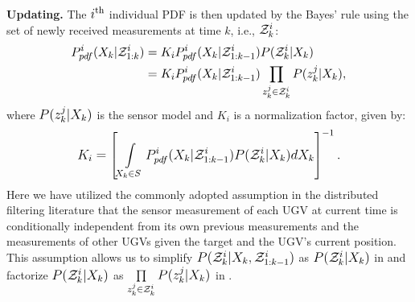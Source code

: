 	\textbf{Updating.}
	The $i\thi$ individual PDF is then updated by the Bayes' rule using the set of newly received measurements at time $k$, i.e., $\Z^i_k$:
	\begin{subequations}\label{eqn:bayes_upd}
		\small\begin{align}
				P^i_{pdf}(\X_k|\Z^i_{1:k})
				&= K_iP^i_{pdf}(\X_k|\Z^i_{1:k-1})P(\Z^i_k|\X_k)\label{subeqn:bayes_upd_general}\\
				&=K_iP^i_{pdf}(\X_k|\Z^i_{1:k-1})\prod\limits_{z^j_k\in\Z^i_k}P(z^j_k|\X_{k})\label{subeqn:bayes_upd_factor},
		\end{align}\normalsize
	\end{subequations}
	where $P(z^j_k|\X_k)$ is the sensor model and $K_i$ is a normalization factor, given by:
	\small\begin{align*}
	K_i=\left[\int\limits_{\X_k\in S} P^i_{pdf}(\X_k|\Z^i_{1:k-1})P(\Z^i_k|\X_k)d\X_k\right]^{-1}.
	\end{align*}\normalsize
	\textcolor{\revcol}{Here we have utilized the commonly adopted assumption \cite{furukawa2006recursive,gu2007distributed,sheng2005distributed} in the distributed filtering literature that the sensor measurement of each UGV at current time is conditionally independent from its own previous measurements and the measurements of other UGVs given the target and the UGV's current position.
	This assumption allows us to simplify $P(\Z^i_k|\X_k,\Z^i_{1:k-1})$ as $P(\Z^i_k|\X_k)$ in  and factorize $P(\Z^i_k|\X_k)$ as $\prod\limits_{z^j_k\in\Z^i_k}P(z^j_k|\X_{k})$ in .}
	
